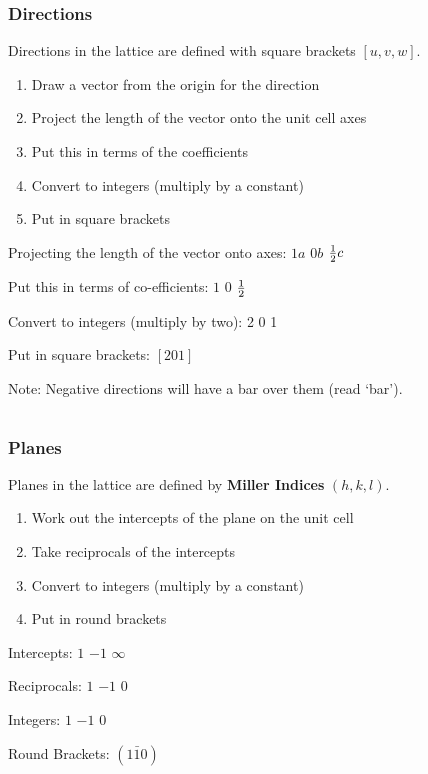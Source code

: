 \documentclass[12pt]{article}
\begin{document}
\subsubsection{Directions}
Directions in the lattice are defined with square brackets $[u,v,w]$.

\begin{enumerate}
  \item Draw a vector from the origin for the direction 
  \item Project the length of the vector onto the unit cell axes 
  \item Put this in terms of the coefficients 
  \item Convert to integers (multiply by a constant)
  \item Put in square brackets 
\end{enumerate}

\begin{example}
  Projecting the length of the vector onto axes:
  $1a$ $0b$ $\frac{1}{2} c$

  Put this in terms of co-efficients:
  $1$ $0$ $\frac{1}{2}$

  Convert to integers (multiply by two):
  2 0 1

  Put in square brackets:
  $[201]$
\end{example}

Note: Negative directions will have a bar over them (read `bar').  

\begin{equation*}
[1\bar{1}0]
\end{equation*}

\subsubsection{Planes}
Planes in the lattice are defined by \textbf{Miller Indices} $(h,k,l)$.

\begin{enumerate}
  \item Work out the intercepts of the plane on the unit cell 
  \item Take reciprocals of the intercepts 
  \item Convert to integers (multiply by a constant)
  \item Put in round brackets 
\end{enumerate}

\begin{example}
  Intercepts: $1$ $-1$ $\infty$

  Reciprocals: $1$ $-1$ $0$

  Integers: $1$ $-1$ $0$

  Round Brackets: $(1\bar{1}0)$
\end{example}
\end{document}
